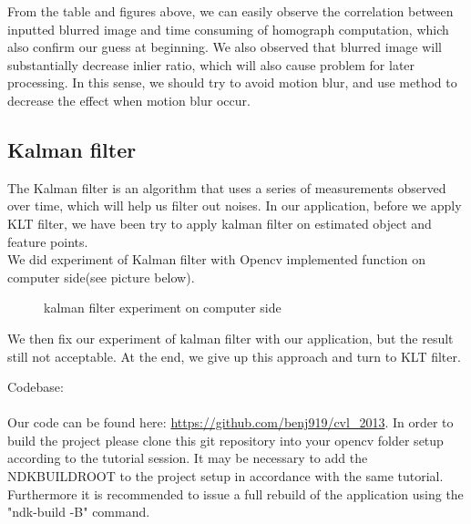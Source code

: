 \documentclass[10pt,conference,compsocconf]{IEEEtran}
\begin{document}
From the table and figures above, we can easily observe the correlation between inputted blurred image and time consuming of homograph computation, which also confirm our guess at beginning. We also observed that blurred image will substantially decrease inlier ratio, which will also cause problem for later processing. In this sense, we should try to avoid motion blur, and use method to decrease the effect when motion blur occur.

\subsection{Kalman filter}

The Kalman filter is an algorithm that uses a series of measurements observed over time, which will help us filter out noises. In our application, before we apply KLT filter, we have been try to apply kalman filter on estimated object and feature points.\\

We did experiment of Kalman filter with Opencv implemented  function on computer side(see picture below).\\

\begin{figure}[h!]
  \centering
  \caption{kalman filter experiment on computer side}
\end{figure}

We then fix our experiment of kalman filter with our application, but the result still not acceptable. At the end, we give up this approach and turn to KLT filter.

\appendix
Codebase:\\\\
Our code can be found here: \url{https://github.com/benj919/cvl_2013}. In order to build the project please clone this git repository into your opencv folder setup according to the tutorial session. It may be necessary to add the NDKBUILDROOT to the project setup in accordance with the same tutorial. Furthermore it is recommended to issue a full rebuild of the application using the "ndk-build -B" command.
\end{document}
